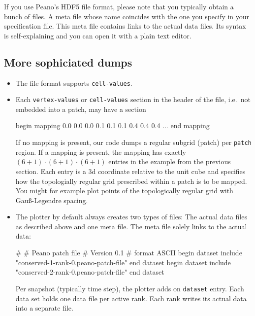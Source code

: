 \noindent
If you use Peano's HDF5 file format, please note that you typically obtain
a bunch of files. 
A meta file whose name coincides with the one you specify in your specification
file. 
This meta file contains links to the actual data files. 
Its syntax is self-explaining and you can open it with a plain text editor.


\subsection{More sophiciated dumps}

\begin{itemize}
  \item The file format supports \texttt{cell-values}.
  \item Each \texttt{vertex-values} or \texttt{cell-values} section in the
  header of the file, i.e.~not embedded into a patch, may have a section
  \begin{code}
   begin mapping
     0.0 0.0 0.0
     0.1 0.1 0.1
     0.4 0.4 0.4
     ...
   end mapping
  \end{code} 
  If no mapping is present, our code dumps a regular subgrid (patch) per
  \texttt{patch} region. If a mapping is present, the mapping has exactly $(6+1)
  \cdot (6+1) \cdot (6+1)$ entries in the example from the previous section.
  Each entry is a 3d coordinate relative to the unit cube and specifies how the
  topologially regular grid prescribed within a patch is to be mapped. You might
  for example plot points of the topologically regular grid with 
  Gau\ss -Legendre spacing.
  \item The plotter by default always creates two types of files: The actual
  data files as described above and one meta file. The meta file solely links to
  the actual data:
  \begin{code}
# 
# Peano patch file 
# Version 0.1 
# 
format ASCII
begin dataset
  include "conserved-1-rank-0.peano-patch-file"
end dataset
begin dataset
  include "conserved-2-rank-0.peano-patch-file"
end dataset
  \end{code}
  Per snapshot (typically time step), the plotter adds on \texttt{dataset}
  entry. Each data set holds one data file per active rank. Each rank writes its
  actual data into a separate file. 
\end{itemize}



